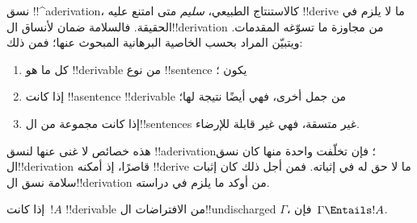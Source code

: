 \documentclass[../../../include/open-logic-section]{subfiles}
\begin{document}
      {}
      {}
      

\begin{explain}
نسق !!^a{derivation}، كالاستنتاج الطبيعي، \emph{سليم} متى امتنع عليه
!!{derive} ما لا يلزم في الحقيقة. فالسلامة ضمان لأنساق ال!!{derivation}
من مجاوزة ما تسوّغه المقدمات. ويتبيّن المراد بحسب الخاصية البرهانية
المبحوث عنها؛ فمن ذلك:
\begin{enumerate}
\item كل ما هو !!{derivable} من نوع !!{sentence} يكون ؛
\item إذا كانت !!a{sentence} !!{derivable} من جمل أخرى، فهي أيضًا
  نتيجة لها؛
\item إذا كانت مجموعة من ال!!{sentence}s غير متسقة، فهي غير قابلة
  للإرضاء.
\end{enumerate}
هذه خصائص لا غنى عنها لنسق !!a{derivation}؛ فإن تخلّفت واحدة منها
كان نسق ال!!{derivation} قاصرًا، إذ أمكنه !!{derive} ما لا حق له في
إثباته. فمن أجل ذلك كان إثبات سلامة نسق ال!!{derivation} من أوكد
ما يلزم في دراسته.
\end{explain}

\begin{thm}[السلامة]
إذا كانت~$!A$ !!{derivable} من الافتراضات ال!!{undischarged}
$\Gamma$، فإن~$\Gamma \Entails !A$.
\end{thm}
\end{document}
